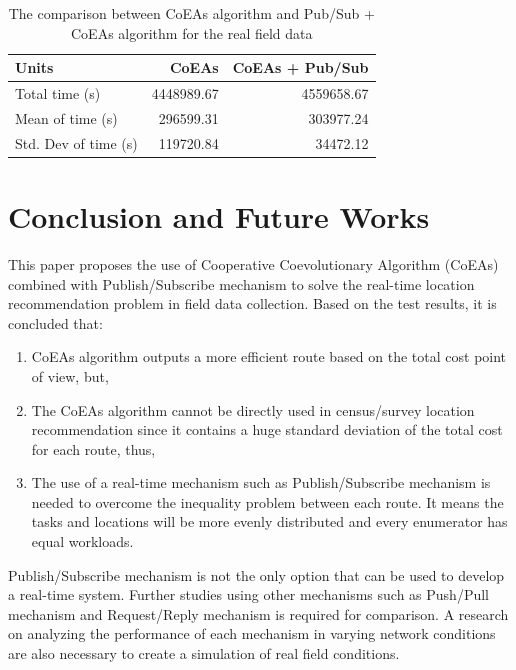\documentclass[conference]{IEEEtran}
\newcommand{\ra}[1]{\renewcommand{\arraystretch}{#1}}
\begin{document}
\begin{table}
	\centering
	\ra{1.3}
	\caption{The comparison between CoEAs algorithm and Pub/Sub + CoEAs algorithm for the real field data}
	\label{tbl:test_result_normal_field_comparison}
	\begin{tabular}{lrr}
		\toprule
		Units & CoEAs & CoEAs + Pub/Sub\\ 
		\midrule
		Total time (s) & 4448989.67 & 4559658.67\\
		Mean of time (s) & 296599.31 & 303977.24\\
		Std. Dev of time (s) & 119720.84 & 34472.12\\
		\bottomrule
	\end{tabular}
\end{table}


\section{Conclusion and Future Works}
\label{sec:conclusion-future-works}
This paper proposes the use of Cooperative Coevolutionary Algorithm (CoEAs) combined with Publish/Subscribe mechanism to solve the real-time location recommendation problem in field data collection. Based on the test results, it is concluded that: 

\begin{enumerate}
	\item CoEAs algorithm outputs a more efficient route based on the total cost point of view, but, 
	\item The CoEAs algorithm cannot be directly used in census/survey location recommendation since it contains a huge standard deviation of the total cost for each route, thus, 
	\item The use of a real-time mechanism such as Publish/Subscribe mechanism is needed to overcome the inequality problem between each route. It means the tasks and locations will be more evenly distributed and every enumerator has equal workloads.
\end{enumerate}


Publish/Subscribe mechanism is not the only option that can be used to develop a real-time system. Further studies using other mechanisms such as Push/Pull mechanism and Request/Reply mechanism is required for comparison. A research on analyzing the performance of each mechanism in varying network conditions are also necessary to create a simulation of real field conditions.
\end{document}
